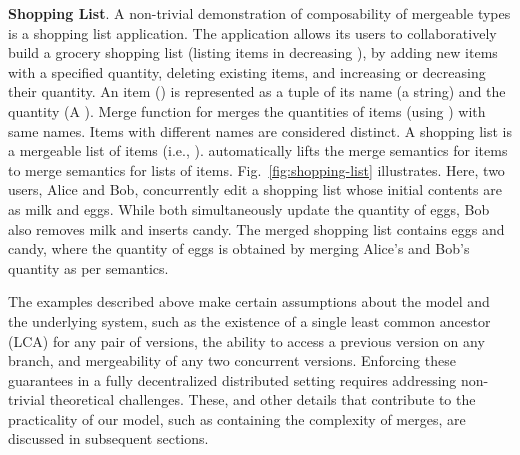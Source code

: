

{\bf Shopping List}. A non-trivial demonstration of composability of
mergeable types is a shopping list application. The application
allows its users to collaboratively build a grocery shopping
list (listing items in decreasing ), by adding new items with a
specified quantity, deleting existing items, and increasing or
decreasing their quantity. An item () is represented as a
tuple of its name (a string) and the quantity (A ). Merge
function for  merges the quantities of items (using
) with same names. Items with different names are
considered distinct. A shopping list is a mergeable list of items
(i.e., ).  automatically lifts the
merge semantics for items to merge semantics for lists of items.
Fig.~\ref{fig:shopping-list} illustrates. Here, two users, Alice and
Bob, concurrently edit a shopping list whose initial contents are
as milk and eggs. While both simultaneously update the quantity of
eggs, Bob also removes milk and inserts candy. The merged shopping
list contains eggs and candy, where the quantity of eggs is obtained
by merging Alice's and Bob's quantity as per  semantics.

The examples described above make certain assumptions about the model
and the underlying system, such as the existence of a single least
common ancestor (LCA) for any pair of versions, the ability to access
a previous version on any branch, and mergeability of any two
concurrent versions. Enforcing these guarantees in a fully
decentralized distributed setting requires addressing non-trivial
theoretical challenges. These, and other details that contribute to
the practicality of our model, such as containing the complexity of
merges, are discussed in subsequent sections.

